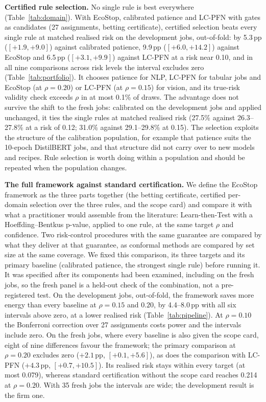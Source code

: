 \documentclass[3p,twocolumn,10pt]{elsarticle}
\theoremstyle{definition}
\begin{document}
\textbf{Certified rule selection.} No single rule is best everywhere (Table~\ref{tab:domain}). With EcoStop, calibrated patience and LC-PFN with gates as candidates (27 assignments, betting certificate), certified selection beats every single rule at matched realised risk on the development jobs, out-of-fold: by 5.3\,pp ($[+1.9,+9.0]$) against calibrated patience, 9.9\,pp ($[+6.0,+14.2]$) against EcoStop and 6.5\,pp ($[+3.1,+9.9]$) against LC-PFN at a risk near 0.10, and in all nine comparisons across risk levels the interval excludes zero (Table~\ref{tab:portfolio}). It chooses patience for NLP, LC-PFN for tabular jobs and EcoStop (at $\rho=0.20$) or LC-PFN (at $\rho=0.15$) for vision, and its true-risk validity check exceeds $\rho$ in at most 0.1\% of draws. The advantage does not survive the shift to the fresh jobs: calibrated on the development jobs and applied unchanged, it ties the single rules at matched realised risk (27.5\% against 26.3--27.8\% at a risk of 0.12; 31.0\% against 29.1--29.8\% at 0.15). The selection exploits the structure of the calibration population, for example that patience suits the 10-epoch DistilBERT jobs, and that structure did not carry over to new models and recipes. Rule selection is worth doing within a population and should be repeated when the population changes.

\textbf{The full framework against standard certification.} We define the EcoStop framework as the three parts together (the betting certificate, certified per-domain selection over the three rules, and the scope card) and compare it with what a practitioner would assemble from the literature: Learn-then-Test with a Hoeffding--Bentkus p-value, applied to one rule, at the same target $\rho$ and confidence. Two risk-control procedures with the same guarantee are compared by what they deliver at that guarantee, as conformal methods are compared by set size at the same coverage. We fixed this comparison, its three targets and its primary baseline (calibrated patience, the strongest single rule) before running it. It was specified after its components had been examined, including on the fresh jobs, so the fresh panel is a held-out check of the combination, not a pre-registered test. On the development jobs, out-of-fold, the framework saves more energy than every baseline at $\rho=0.15$ and $0.20$, by 4.4--8.0\,pp with all six intervals above zero, at a lower realised risk (Table~\ref{tab:pipeline}). At $\rho=0.10$ the Bonferroni correction over 27 assignments costs power and the intervals include zero. On the fresh jobs, where every baseline is also given the scope card, eight of nine differences favour the framework; the primary comparison at $\rho=0.20$ excludes zero ($+2.1$\,pp, $[+0.1,+5.6]$), as does the comparison with LC-PFN ($+4.3$\,pp, $[+0.7,+10.5]$). Its realised risk stays within every target (at most 0.079), whereas standard certification without the scope card reaches 0.214 at $\rho=0.20$. With 35 fresh jobs the intervals are wide; the development result is the firm one.
\end{document}

